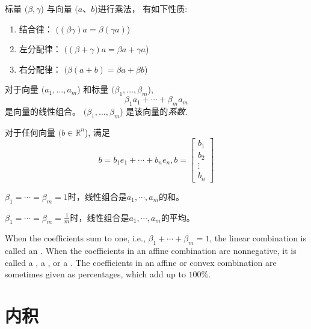 \begin{theorem}
    标量 $( \beta, \gamma $) 与向量 $( a 、 b $)进行乘法， 有如下性质:
    \begin{enumerate}
        \item 结合律： $( (\beta \gamma) a=\beta(\gamma a) $)
        \item 左分配律： $( (\beta+\gamma) a=\beta a+\gamma a $)
        \item 右分配律： $( \beta(a+b)=\beta a+\beta b $)
    \end{enumerate}
\end{theorem}

\begin{definition}[线性组合]
    对于向量 $( a_{1}, \ldots, a_{m} $) 和标量 $( \beta_{1}, \ldots, \beta_{m} $),
    \begin{equation} \beta_{1} a_{1}+\cdots+\beta_{m} a_{m} \end{equation}
    是向量的线性组合。 $( \beta_{1}, \ldots, \beta_{m} $) 是该向量的\textit{系数}. 
\end{definition}



    \begin{theorem}
        对于任何向量 $( b \in \mathbb{R}^{n} $), 满足
    \begin{equation} b=b_{1} e_{1}+\cdots+b_{n} e_{n}, b=\left[\begin{array}{c}b_{1} \\ b_{2} \\ \vdots \\ b_{n}\end{array}\right] \end{equation}
    \end{theorem}
    
    $ \beta_{1}=\cdots=\beta_{m}=1 $时，线性组合是$a_1, \cdots, a_m$的和。

    $ \beta_{1}=\cdots=\beta_{m} = \frac{1}{m} $时，线性组合是$a_1, \cdots, a_m$的平均。

    When the coefficients sum to one, i.e., $ \beta_{1}+\cdots+\beta_{m}=1 $, the linear combination is called an . When the coefficients in an affine combination are nonnegative, it is called a , a , or a . The coefficients in an affine or convex combination are sometimes given as percentages, which add up to $ 100 \% $.

\section{内积}

